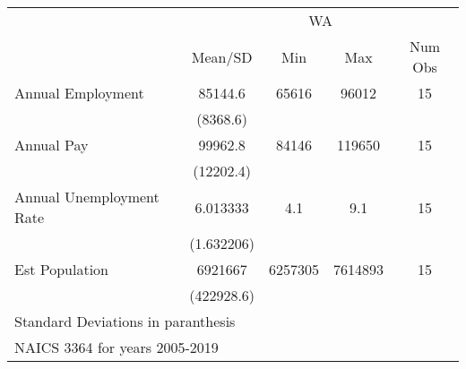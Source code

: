 {
\def\sym#1{\ifmmode^{#1}\else\(^{#1}\)\fi}
\begin{tabular}{l*{1}{cccc}}
\hline\hline
            &\multicolumn{4}{c}{WA}                             \\
            &     Mean/SD&         Min&         Max&     Num Obs\\
\hline
Annual Employment&     85144.6&       65616&       96012&          15\\
            &    (8368.6)&            &            &            \\
Annual Pay  &     99962.8&       84146&      119650&          15\\
            &   (12202.4)&            &            &            \\
Annual Unemployment Rate&    6.013333&         4.1&         9.1&          15\\
            &  (1.632206)&            &            &            \\
Est Population&     6921667&     6257305&     7614893&          15\\
            &  (422928.6)&            &            &            \\
\hline\hline
\multicolumn{5}{l}{\footnotesize Standard Deviations in paranthesis}\\
\multicolumn{5}{l}{\footnotesize NAICS 3364 for years 2005-2019}\\
\end{tabular}
}
